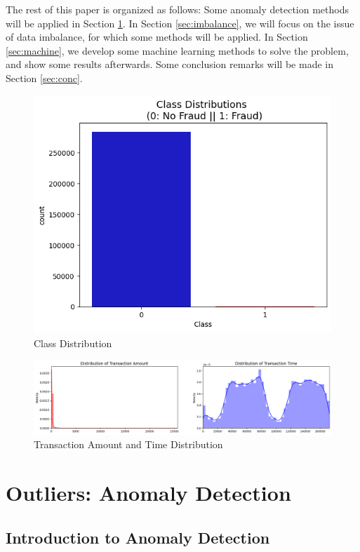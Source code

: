 The rest of this paper is organized as follows: Some anomaly detection methods will be applied in Section \ref{sec:outliers}. In Section \ref{sec:imbalance}, we will focus on the issue of data imbalance, for which some methods will be applied. In Section \ref{sec:machine}, we develop some machine learning methods to solve the problem, and show some results afterwards. Some conclusion remarks will be made in Section \ref{sec:conc}.


\begin{figure}[htbp]
	\centering
	\includegraphics[width=0.7\linewidth]{../output7}
	\caption[Class Distribution]{Class Distribution}
	\label{fig:ClassDistribution}
\end{figure}

\begin{figure}[htbp]
	\centering
	\includegraphics[width=0.7\linewidth]{../output8}
	\caption[Transaction Amount and Time Distribution ]{Transaction Amount and Time Distribution}
	\label{fig:TransactionAmount}
\end{figure}











\section{Outliers: Anomaly Detection}
\label{sec:outliers}
\subsection{Introduction to Anomaly Detection}

